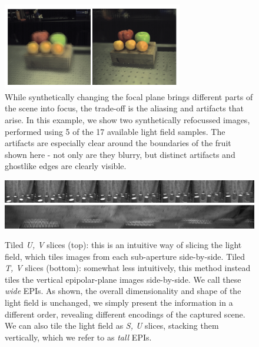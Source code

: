 \begin{figure}[H]
    \centering
    \includegraphics[width=0.7\textwidth]{images/fruitfocus.png}
    \caption[Artifacts from synthetic refocusing]{While synthetically changing the focal plane brings different parts of the scene into focus, the trade-off is the aliasing and artifacts that arise. In this example, we show two synthetically refocussed images, performed using 5 of the 17 available light field samples. The artifacts are especially clear around the boundaries of the fruit shown here - not only are they blurry, but distinct artifacts and ghostlike edges are clearly visible.}
\end{figure}

\begin{figure}[H]
    \centering 
    \includegraphics[width=6in]{images/epitile_3.png}
    \includegraphics[width=6in]{images/epitile_2.png}
    \caption[Two different ways of slicing the light field]{Tiled \textit{U, V} slices (top): this is an intuitive way of slicing the light field, which tiles images from each sub-aperture side-by-side. Tiled \textit{T, V} slices (bottom): somewhat less intuitively, this method instead tiles the vertical epipolar-plane images side-by-side. We call these \textit{wide} EPIs. As shown, the overall dimensionality and shape of the light field is unchanged, we simply present the information in a different order, revealing different encodings of the captured scene. We can also tile the light field as \textit{S, U} slices, stacking them vertically, which we refer to as \textit{tall} EPIs.}
\end{figure}

